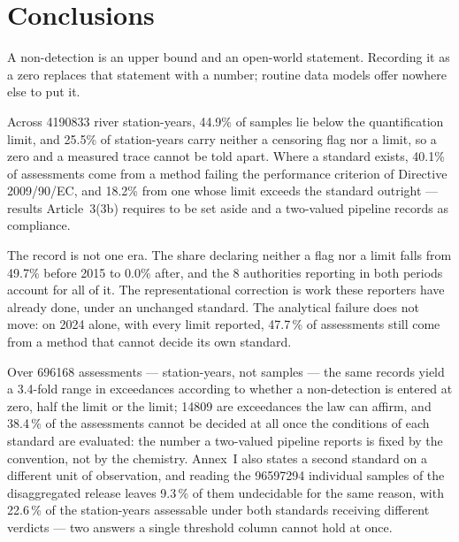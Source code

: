 \section{Conclusions}

A non-detection is an upper bound and an open-world statement. Recording it as a
zero replaces that statement with a number; routine data models offer nowhere
else to put it.

Across \num{4190833} river station-years, \num{44.9}\% of samples lie below the
quantification limit, and \num{25.5}\% of station-years carry neither a censoring
flag nor a limit, so a zero and a measured trace cannot be told apart. Where a
standard exists, \num{40.1}\% of assessments come from a method failing the
performance criterion of Directive 2009/90/EC, and \num{18.2}\% from one whose
limit exceeds the standard outright --- results Article~3(3b) requires to be set
aside and a two-valued pipeline records as compliance.

The record is not one era. The share declaring neither a flag nor a limit falls
from \num{49.7}\% before \num{2015} to \num{0.0}\% after, and the \num{8}
authorities reporting in both periods account for all of it. The
representational correction is work these reporters have already done, under an
unchanged standard. The analytical failure does not move: on \num{2024} alone,
with every limit reported, \num{47.7}\,\% of assessments still come from a
method that cannot decide its own standard.

Over \num{696168} assessments --- station-years, not samples --- the same
records yield a \num{3.4}-fold range in exceedances according to whether a
non-detection is entered at zero, half the limit or the limit; \num{14809}
are exceedances the law can affirm, and \num{38.4}\,\% of the assessments cannot
be decided at all once the conditions of each standard are evaluated: the number
a two-valued pipeline reports is fixed by the convention, not by the chemistry. Annex~I also
states a second standard on a different unit of observation, and reading the
\num{96597294} individual samples of the disaggregated release leaves
\num{9.3}\,\% of them undecidable for the same reason, with \num{22.6}\,\% of
the station-years assessable under both standards receiving different verdicts
--- two answers a single threshold column cannot hold at once.

